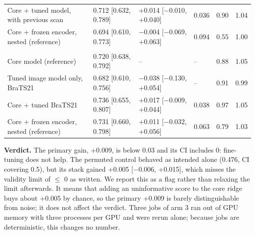 \documentclass[11pt,a4paper]{article}
\begin{document}
\begin{table}[H]
\begin{tabularx}{\linewidth}{@{}L R{2.6cm} R{2.9cm} R{1.0cm} R{1.0cm} R{0.8cm}@{}}
Core + tuned model, with previous scan & 0.712 [0.632, 0.789] & +0.014 [$-$0.010, +0.040] & 0.036 & 0.90 & 1.04 \\
Core + frozen encoder, nested (reference) & 0.694 [0.610, 0.773] & $-$0.004 [$-$0.069, +0.063] & 0.094 & 0.55 & 1.00 \\
\addlinespace
{} \\
Core model (reference) & 0.720 [0.638, 0.792] & -- & -- & 0.88 & 1.05 \\
Tuned image model only, BraTS21 & 0.682 [0.610, 0.756] & $-$0.038 [$-$0.130, +0.054] & -- & 0.91 & 0.99 \\
Core + tuned BraTS21 & 0.736 [0.655, 0.807] & +0.017 [$-$0.009, +0.044] & 0.038 & 0.97 & 1.05 \\
Core + frozen encoder, nested (reference) & 0.731 [0.660, 0.798] & +0.011 [$-$0.032, +0.056] & 0.063 & 0.79 & 1.03 \\
\bottomrule
\end{tabularx}
\end{table}

\textbf{Verdict.} The primary gain, +0.009, is below 0.03 and its CI includes 0: fine-tuning does not help. The
permuted control behaved as intended alone (0.476, CI covering 0.5), but its stack gained +0.005 [$-$0.006, +0.015],
which misses the validity limit of $\leq$ 0 as written. We report this as a flag rather than relaxing the limit
afterwards. It means that adding an uninformative score to the core ridge buys about +0.005 by chance, so the primary
+0.009 is barely distinguishable from noise; it does not affect the verdict. Three jobs of arm 3 ran out of GPU memory
with three processes per GPU and were rerun alone; because jobs are deterministic, this changes no number.
\end{document}
